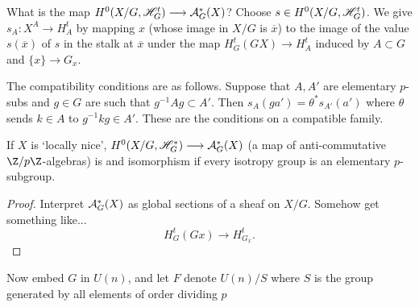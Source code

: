 \documentclass[11pt]{article}
\begin{document}
\begin{JeremyQuillenPractice}
What is the map $H^0(X/G,\mathscr{H}_G^t)\longrightarrow \mathcal{A}_G^*(X)$? Choose $s\in H^0(X/G,\mathscr{H}_G^t)$. We give $s_A:X^A\to H_A^t$ by mapping $x$ (whose image in $X/G$ is $\overline x$) to the image of the value $s(\overline x)$ of $s$ in the stalk at $\overline x$ under the map $H^t_G(GX)\to H^t_A$ induced by $A\subset G$ and $\{x\}\to G_x$.

The compatibility conditions are as follows. Suppose that $A,A'$ are elementary $p$-subs and $g\in G$ are such that $g^{-1}Ag\subset A'$. Then $s_A(ga')=\theta^*s_{A'}(a')$ where $\theta$ sends $k\in A$ to $g^{-1}kg\in A'$. These are the conditions on a compatible family.
\begin{prop*}
If $X$ is `locally nice', $H^0(X/G,\mathscr{H}^*_G)\longrightarrow\mathcal{A}_G^*(X)$ (a map of anti-commutative $\Z/p\Z$-algebras) is and isomorphism if every isotropy group is an elementary $p$-subgroup.
\end{prop*}
\begin{proof}
Interpret $\mathcal{A}_G^*(X)$ as global sections of a sheaf on $X/G$. Somehow get something like...
\[H_G^t(Gx)\to H^t_{G_x}.\]
\end{proof}
Now embed $G$ in $U(n)$, and let $F$ denote $U(n)/S$ where $S$ is the group generated by all elements of order dividing $p$


\pagebreak
\end{JeremyQuillenPractice}
\end{document}
